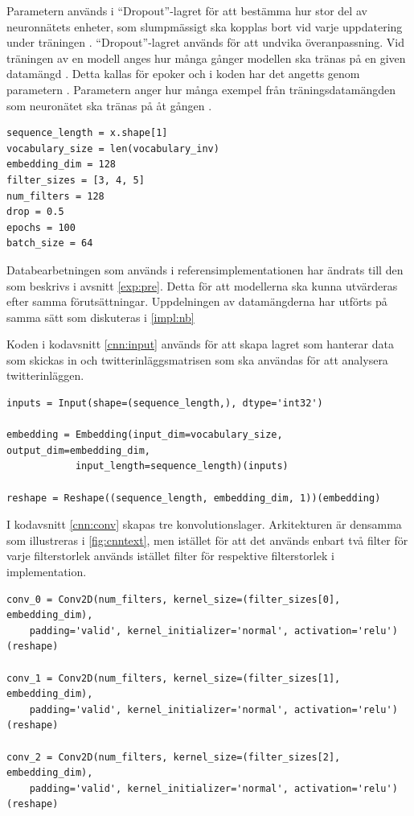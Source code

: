\documentclass{kaumasters} %
\begin{document}
Parametern  används i “Dropout”-lagret för att bestämma hur stor del av neuronnätets enheter, som slumpmässigt ska kopplas bort vid varje uppdatering under träningen \cite{impcnn:006}. “Dropout”-lagret används för att undvika överanpassning. Vid träningen av en modell anges hur många gånger modellen ska tränas på en given datamängd \cite{impcnn:007}. Detta kallas för epoker och i koden har det angetts genom parametern . Parametern  anger hur många exempel från träningsdatamängden som neuronätet ska tränas på åt gången \cite{impcnn:007}.

\begin{lstlisting}[style=mypython,caption={Parameterurval för CNN.},label=cnn:par]
sequence_length = x.shape[1]
vocabulary_size = len(vocabulary_inv)
embedding_dim = 128
filter_sizes = [3, 4, 5]
num_filters = 128
drop = 0.5
epochs = 100
batch_size = 64
\end{lstlisting}

Databearbetningen som används i referensimplementationen har ändrats till den som beskrivs i avsnitt \ref{exp:pre}. Detta för att modellerna ska kunna utvärderas efter samma förutsättningar. Uppdelningen av datamängderna har utförts på samma sätt som diskuteras i \ref{impl:nb}

Koden i kodavsnitt \ref{cnn:input} används för att skapa lagret som hanterar data som skickas in och twitterinläggsmatrisen som ska användas för att analysera twitterinläggen.

\begin{lstlisting}[style=mypython,caption={Kod för att skapa indata-lagret och twitterinläggsmatrisen.},label=cnn:input]
inputs = Input(shape=(sequence_length,), dtype='int32')

embedding = Embedding(input_dim=vocabulary_size, output_dim=embedding_dim,
			input_length=sequence_length)(inputs)
			
reshape = Reshape((sequence_length, embedding_dim, 1))(embedding)
\end{lstlisting}

I kodavsnitt \ref{cnn:conv} skapas tre konvolutionslager. Arkitekturen är densamma som illustreras i \ref{fig:cnntext}, men istället för att det används enbart två filter för varje filterstorlek används istället  filter för respektive filterstorlek i implementation.

\begin{lstlisting}[style=mypython,caption={Kod för att skapa konvulsionslager.},label=cnn:conv]
conv_0 = Conv2D(num_filters, kernel_size=(filter_sizes[0], embedding_dim), 
    padding='valid', kernel_initializer='normal', activation='relu')(reshape)
	
conv_1 = Conv2D(num_filters, kernel_size=(filter_sizes[1], embedding_dim), 
    padding='valid', kernel_initializer='normal', activation='relu')(reshape)
	
conv_2 = Conv2D(num_filters, kernel_size=(filter_sizes[2], embedding_dim), 
    padding='valid', kernel_initializer='normal', activation='relu')(reshape)
\end{lstlisting}
\end{document}
